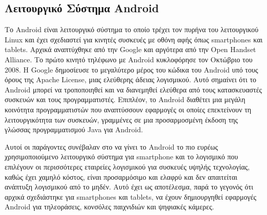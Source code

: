 \documentclass[12pt,twoside,openright]{report}
\begin{document}
\subsection{\gt Λειτουργικό Σύστημα \lt Android\gt}
Το \lt Android \gt είναι λειτουργικό σύστημα το οποίο τρέχει τον πυρήνα του λειτουργικού \lt Linux \gt και έχει σχεδιαστεί για κινητές συσκευές με οθόνη αφής όπως \lt smartphones \gt και \lt tablets. \gt Αρχικά αναπτύχθηκε από την \lt Google \gt και αργότερα από την \lt Open Handset Alliance. \gt Το πρώτο κινητό τηλέφωνο με \lt Android \gt κυκλοφόρησε τον Οκτώβριο του 2008.  Η \lt Google \gt δημοσίευσε το μεγαλύτερο μέρος του κώδικα του \lt Android \gt υπό τους όρους της \lt Apache License, \gt μιας ελεύθερης άδειας λογισμικού. Αυτό σημαίνει ότι το \lt Android \gt μπορεί  να τροποποιηθεί και να διανεμηθεί ελεύθερα από τους κατασκευαστές συσκευών και τους προγραμματιστές. Επιπλέον, το \lt Android \gt διαθέτει μια μεγάλη κοινότητα προγραμματιστών που αναπτύσσουν εφαρμογές οι οποίες επεκτείνουν τη λειτουργικότητα των συσκευών, γραμμένες σε μια προσαρμοσμένη έκδοση της γλώσσας προγραμματισμού \lt Java \gt για \lt Android.\gt

Αυτοί οι παράγοντες συνέβαλαν στο να γίνει το \lt Android \gt το πιο ευρέως χρησιμοποιούμενο λειτουργικό σύστημα για \lt smartphone \gt και το λογισμικό που επιλέγουν οι περισσότερες εταιρείες λογισμικού για συσκευές υψηλής τεχνολογίας, καθώς έχει χαμηλό κόστος, είναι προσαρμόσιμο και ελαφρύ και δεν απαιτείται ανάπτυξη λογισμικού από το μηδέν. Αυτό έχει ως αποτέλεσμα, παρά το γεγονός ότι αρχικά σχεδιάστηκε για \lt smartphones \gt και \lt tablets, \gt να έχουν δημιουργηθεί εφαρμογές \lt Android \gt για τηλεοράσεις, κονσόλες παιχνιδιών και ψηφιακές κάμερες.\cite{android}
\end{document}
